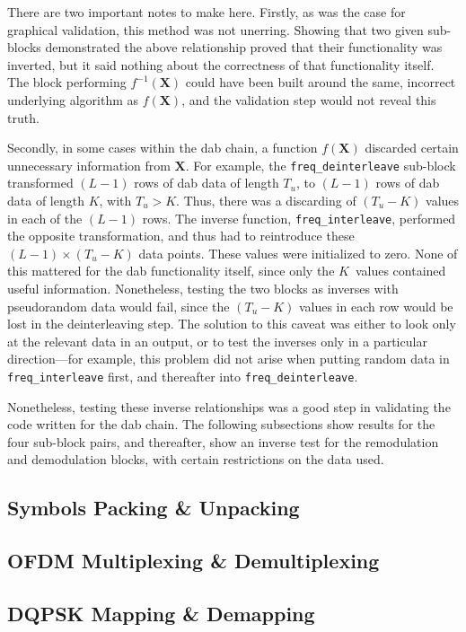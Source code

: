 \documentclass[class=report,11pt,crop=false]{standalone}
\begin{document}
There are two important notes to make here. Firstly, as was the case for graphical validation, this method was not unerring. Showing that two given sub-blocks demonstrated the above relationship proved that their functionality was inverted, but it said nothing about the correctness of that functionality itself. The block performing \(f^{-1}(\mathbf{X})\) could have been built around the same, incorrect underlying algorithm as \(f(\mathbf{X})\), and the validation step would not reveal this truth.

Secondly, in some cases within the \gls{dab} chain, a function \(f(\mathbf{X})\) discarded certain unnecessary information from \(\mathbf{X}\). For example, the \texttt{freq\_deinterleave} sub-block transformed \((L-1)\) rows of \gls{dab} data of length \(T_u\), to \((L-1)\) rows of \gls{dab} data of length \(K\), with \(T_u > K\). Thus, there was a discarding of \((T_u - K)\) values in each of the  \((L-1)\) rows. The inverse function, \texttt{freq\_interleave}, performed the opposite transformation, and thus had to reintroduce these \((L-1)\times(T_u - K)\) data points. These values were initialized to zero. None of this mattered for the \gls{dab} functionality itself, since only the \(K\)~values contained useful information. Nonetheless, testing the two blocks as inverses with pseudorandom data would fail, since the \((T_u - K)\) values in each row would be lost in the deinterleaving step. The solution to this caveat was either to look only at the relevant data in an output, or to test the inverses only in a particular direction---for example, this problem did not arise when putting random data in \texttt{freq\_interleave} first, and thereafter into \texttt{freq\_deinterleave}.

Nonetheless, testing these inverse relationships was a good step in validating the code written for the \gls{dab} chain. The following subsections show results for the four sub-block pairs, and thereafter, show an inverse test for the remodulation and demodulation blocks, with certain restrictions on the data used.

\subsection{Symbols Packing \& Unpacking}
\subsection{OFDM Multiplexing \& Demultiplexing}
\subsection{DQPSK Mapping \& Demapping}
\end{document}
